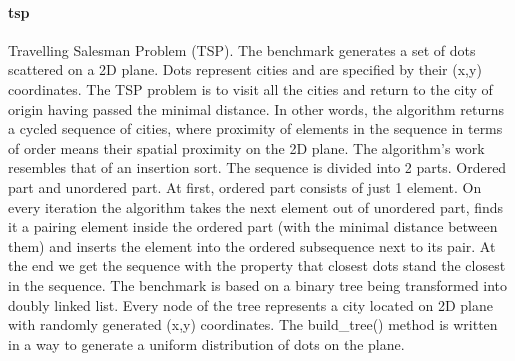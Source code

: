 \paragraph{tsp} Travelling Salesman Problem (TSP). The benchmark generates a set of dots scattered on a 2D plane. Dots represent cities and are specified by their (x,y) coordinates. The TSP problem is to visit all the cities and return to the city of origin having passed the minimal distance. In other words, the algorithm returns a cycled sequence of cities, where proximity of elements in the sequence in terms of order means their spatial proximity on the 2D plane.\newline\null
\quad The algorithm’s work resembles that of an insertion sort. The sequence is divided into 2 parts. Ordered part and unordered part. At first, ordered part consists of just 1 element. On every iteration the algorithm takes the next element out of unordered part, finds it a pairing element inside the ordered part (with the minimal distance between them) and inserts the element into the ordered subsequence next to its pair. At the end we get the sequence with the property that closest dots stand the closest in the sequence.\newline\null
\quad The benchmark is based on a binary tree being transformed into doubly linked list. Every node of the tree represents a city located on 2D plane with randomly generated (x,y) coordinates. The build\_tree() method is written in a way to generate a uniform distribution of dots on the plane.

%